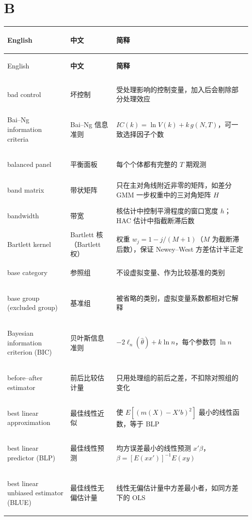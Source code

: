 \par{}\ifdim\dimexpr\pagegoal-\pagetotal\relax<16\baselineskip\newpage\fi
\section*{B}
\begin{longtable}{@{}>{\bfseries\boldmath\raggedright\arraybackslash}p{4.6cm}>{\raggedright\arraybackslash}p{3.2cm}>{\raggedright\arraybackslash}p{\dimexpr\textwidth-7.8cm-4\tabcolsep\relax}@{}}
\toprule
English & \textbf{中文} & \textbf{简释}\\
\midrule
\endfirsthead
\toprule
English & \textbf{中文} & \textbf{简释}\\
\midrule
\endhead
\midrule
\multicolumn{3}{r@{}}{\footnotesize\itshape （续下页）}\\
\endfoot
\bottomrule
\endlastfoot
bad control & 坏控制 & 受处理影响的控制变量，加入后会剔除部分处理效应 \\
Bai--Ng information criteria & Bai--Ng 信息准则 & $IC(k)=\ln V(k)+k\,g(N,T)$，可一致选择因子个数 \\
balanced panel & 平衡面板 & 每个个体都有完整的 $T$ 期观测 \\
band matrix & 带状矩阵 & 只在主对角线附近非零的矩阵，如差分 GMM 一步权重中的三对角矩阵 $H$ \\
bandwidth & 带宽 & 核估计中控制平滑程度的窗口宽度 $h$；HAC 估计中指截断滞后数 \\
Bartlett kernel & Bartlett 核（Bartlett 权） & 权重 $w_j=1-j/(M+1)$（$M$ 为截断滞后数），保证 Newey--West 方差估计半正定 \\
base category & 参照组 & 不设虚拟变量、作为比较基准的类别 \\
base group (excluded group) & 基准组 & 被省略的类别，虚拟变量系数都相对它解释 \\
Bayesian information criterion (BIC) & 贝叶斯信息准则 & $-2\ell_n(\hat\theta)+k\ln n$，每个参数罚 $\ln n$ \\
before--after estimator & 前后比较估计量 & 只用处理组的前后之差，不扣除对照组的变化 \\
best linear approximation & 最佳线性近似 & 使 $E[(m(X)-X'b)^2]$ 最小的线性函数，等于 BLP \\
best linear predictor (BLP) & 最佳线性预测 & 均方误差最小的线性预测 $x'\beta$，$\beta=[E(xx')]^{-1}E(xy)$ \\
best linear unbiased estimator (BLUE) & 最佳线性无偏估计量 & 线性无偏估计量中方差最小者，如同方差下的 OLS \\

\end{longtable}
